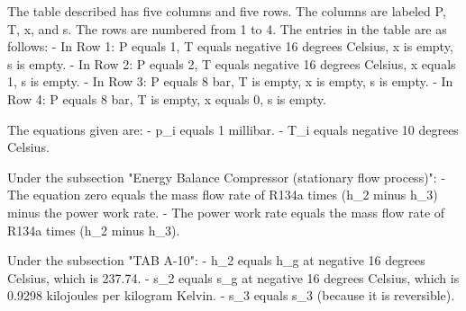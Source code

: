 The table described has five columns and five rows. The columns are labeled P, T, x, and s. The rows are numbered from 1 to 4. The entries in the table are as follows:
- In Row 1: P equals 1, T equals negative 16 degrees Celsius, x is empty, s is empty.
- In Row 2: P equals 2, T equals negative 16 degrees Celsius, x equals 1, s is empty.
- In Row 3: P equals 8 bar, T is empty, x is empty, s is empty.
- In Row 4: P equals 8 bar, T is empty, x equals 0, s is empty.

The equations given are:
- p_i equals 1 millibar.
- T_i equals negative 10 degrees Celsius.

Under the subsection "Energy Balance Compressor (stationary flow process)":
- The equation zero equals the mass flow rate of R134a times (h_2 minus h_3) minus the power work rate.
- The power work rate equals the mass flow rate of R134a times (h_2 minus h_3).

Under the subsection "TAB A-10":
- h_2 equals h_g at negative 16 degrees Celsius, which is 237.74.
- s_2 equals s_g at negative 16 degrees Celsius, which is 0.9298 kilojoules per kilogram Kelvin.
- s_3 equals s_3 (because it is reversible).